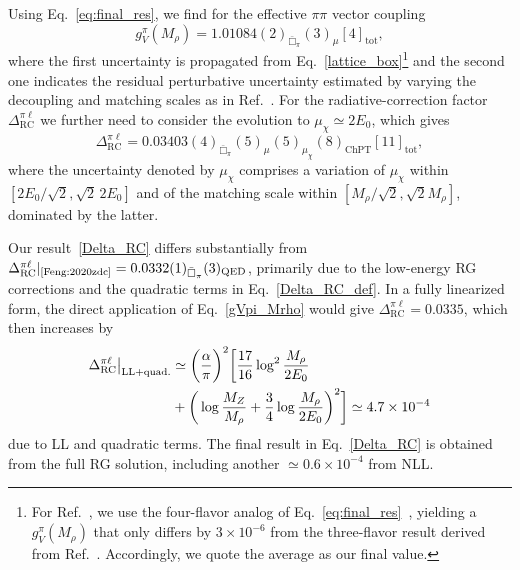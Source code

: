 \documentclass[prl,twocolumn,twoside,preprintnumbers,superscriptaddress,nofootinbib,letterpaper]{revtex4-1}
\begin{document}
Using Eq.~\eqref{eq:final_res}, we find
for the effective $\pi \pi$ vector coupling
\begin{equation}
\label{gVpi_Mrho}
    g_V^\pi (M_\rho)  = 1.01084(2)_{\bar \Box_\pi} (3)_{\mu}[4]_\text{tot},
\end{equation}
where the first uncertainty is propagated from Eq.~\eqref{lattice_box}\footnote{For Ref.~\cite{Yoo:2023gln}, we use the four-flavor analog of Eq.~\eqref{eq:final_res}~\cite{Supp}, yielding a $g_V^\pi(M_\rho)$ that only differs by $3 \times 10^{-6}$ from the three-flavor result derived from Ref.~\cite{Feng:2020zdc}. Accordingly, we quote the average as our final value.} and the second one indicates the residual perturbative uncertainty estimated by varying the  decoupling and matching scales as in Ref.~\cite{Gorbahn:2025ssv}.
For the radiative-correction factor $\Delta_\text{RC}^{\pi\ell}$ we further need to consider the evolution to $\mu_\chi\simeq 2E_0$, which gives
\begin{equation}
\label{Delta_RC}
\Delta_\text{RC}^{\pi\ell} = 0.03403(4)_{\bar \Box_\pi} (5)_{\mu} (5)_{\mu_\chi}(8)_\text{ChPT}[11]_\text{tot},
\end{equation}
where the uncertainty denoted by $\mu_\chi$ comprises a variation of $\mu_\chi$ within $[2E_0/\sqrt{2}, \sqrt{2}\, 2E_0]$ and of the matching scale within $[M_\rho/\sqrt{2},\sqrt{2}M_\rho]$, dominated by the latter.


Our result~\eqref{Delta_RC} differs substantially from $\Delta_\text{RC}^{\pi\ell}|_\text{\cite{Feng:2020zdc}}=0.0332(1)_{\bar \Box_\pi}(3)_\text{QED}$, primarily due to the low-energy RG corrections and the quadratic terms in Eq.~\eqref{Delta_RC_def}. In a fully linearized form,
the direct application of Eq.~\eqref{gVpi_Mrho} would give $\Delta_\text{RC}^{\pi\ell}=0.0335$, which then increases by
\begin{align}
\Delta_\text{RC}^{\pi\ell}\big|_\text{LL+quad.}&\simeq \bigg(\frac{\alpha}{\pi}\bigg)^2\bigg[\frac{17}{16}\log^2\frac{M_\rho}{2E_0}\\
&+\bigg(\log\frac{M_Z}{M_\rho}+\frac{3}{4}\log\frac{M_\rho}{2E_0}\bigg)^2\bigg]
\simeq 4.7\times 10^{-4}\notag
\end{align}
due to LL and quadratic terms.
The final result in Eq.~\eqref{Delta_RC} is obtained from the full RG solution, including another $\simeq 0.6\times 10^{-4}$ from NLL.
\end{document}
